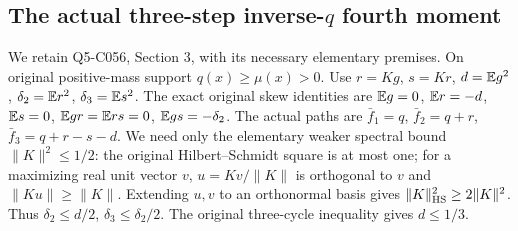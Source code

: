 \subsection{The actual three-step inverse-$q$ fourth moment}\label{proof:Q5-C056}
We retain Q5-C056, Section 3, with its necessary elementary premises.
On original positive-mass support $q(x)\ge\mu(x)>0$.
Use $r=Kg$, $s=Kr$, $d=\mathbb E g^2$, $\delta_2=\mathbb E r^2$,
$\delta_3=\mathbb E s^2$.
The exact original skew identities are
$\mathbb E g=0$, $\mathbb E r=-d$, $\mathbb E s=0$,
$\mathbb E gr=\mathbb E rs=0$, $\mathbb E gs=-\delta_2$.
The actual paths are $\bar f_1=q$, $\bar f_2=q+r$,
$\bar f_3=q+r-s-d$.
We need only the elementary weaker spectral bound $\|K\|^2\le1/2$:
the original Hilbert--Schmidt square is at most one; for a maximizing
real unit vector $v$, $u=Kv/\|K\|$ is orthogonal to $v$ and
$\|Ku\|\ge\|K\|$. Extending $u,v$ to an orthonormal basis gives
$\|K\|_{\rm HS}^2\ge2\|K\|^2$.
Thus $\delta_2\le d/2$, $\delta_3\le\delta_2/2$.
The original three-cycle inequality gives $d\le1/3$.

